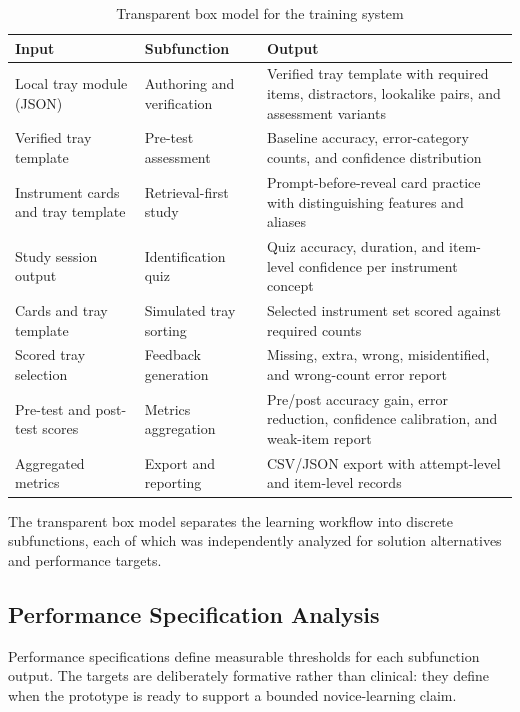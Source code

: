 \documentclass[10pt,a4paper]{article}
\begin{document}
\begin{table}[H]
\centering
\caption{Transparent box model for the training system}
\label{tab:transparent-box-model}
\small\renewcommand{\arraystretch}{1.2}\setlength{\tabcolsep}{4pt}
\begin{tabularx}{\textwidth}{|>{\raggedright\arraybackslash}X|>{\raggedright\arraybackslash}X|>{\raggedright\arraybackslash}X|}
\hline
Input & Subfunction & Output \\
\hline
Local tray module (JSON) & Authoring and verification & Verified tray template with required items, distractors, lookalike pairs, and assessment variants \\
\hline
Verified tray template & Pre-test assessment & Baseline accuracy, error-category counts, and confidence distribution \\
\hline
Instrument cards and tray template & Retrieval-first study & Prompt-before-reveal card practice with distinguishing features and aliases \\
\hline
Study session output & Identification quiz & Quiz accuracy, duration, and item-level confidence per instrument concept \\
\hline
Cards and tray template & Simulated tray sorting & Selected instrument set scored against required counts \\
\hline
Scored tray selection & Feedback generation & Missing, extra, wrong, misidentified, and wrong-count error report \\
\hline
Pre-test and post-test scores & Metrics aggregation & Pre/post accuracy gain, error reduction, confidence calibration, and weak-item report \\
\hline
Aggregated metrics & Export and reporting & CSV/JSON export with attempt-level and item-level records \\
\hline
\end{tabularx}
\end{table}

The transparent box model separates the learning workflow into discrete
subfunctions, each of which was independently analyzed for solution alternatives
and performance targets.

\subsection{Performance Specification Analysis}
\label{sec:performance-specification-analysis}

Performance specifications define measurable thresholds for each subfunction
output. The targets are deliberately formative rather than clinical: they define
when the prototype is ready to support a bounded novice-learning claim.
\end{document}
